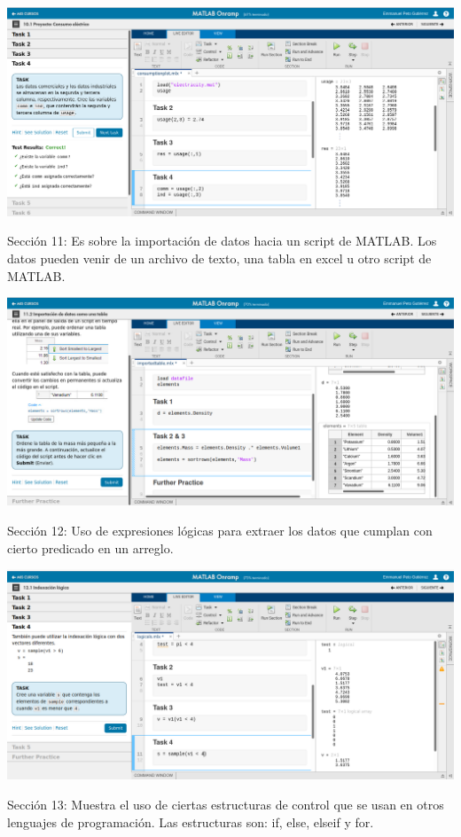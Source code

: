 \documentclass{article}
\begin{document}
\includegraphics[width=\linewidth]{imagenes/10}

Sección 11: Es sobre la importación de datos hacia un script de MATLAB. Los datos pueden venir de un archivo de texto, una tabla en excel u otro script de MATLAB.

\includegraphics[width=\linewidth]{imagenes/11}

Sección 12: Uso de expresiones lógicas para extraer los datos que cumplan con cierto predicado en un arreglo.

\includegraphics[width=\linewidth]{imagenes/12}

Sección 13: Muestra el uso de ciertas estructuras de control que se usan en otros lenguajes de programación. Las estructuras son: if, else, elseif y for.
\end{document}
